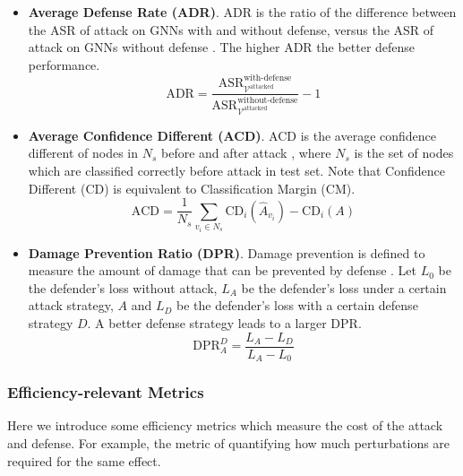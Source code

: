 \begin{itemize}
	\item \textbf{Average Defense Rate (ADR)}. ADR is the ratio of the difference between the ASR of attack on GNNs with and without defense, versus the ASR of attack on GNNs without defense \cite{chen2019can}. The higher ADR the better defense performance.
	      \begin{equation}
		      \text{ADR}=\frac{\text{ASR}^{\text{with-defense}}_{\mathcal{V}^{\text{attacked}}}}{\text{ASR}^{\text{without-defense}}_{\mathcal{V}^{\text{attacked}}}}-1
	      \end{equation}

	\item \textbf{Average Confidence Different (ACD)}. ACD is the average confidence different of nodes in $N_s$ before and after attack \cite{chen2019can}, where $N_s$ is the set of nodes which are classified correctly before attack in test set. Note that Confidence Different (CD) is equivalent to Classification Margin (CM).
	      \begin{equation}
		      \text{ACD}=\frac{1}{N_s}\sum_{v_{i}\in N_{s}} \text{CD}_{i}(\hat{A}_{v_{i}})-\text{CD}_{i}(A)
	      \end{equation}

	\item \textbf{Damage Prevention Ratio (DPR)}. Damage prevention is defined to measure the amount of damage that can be prevented by defense \cite{zhou2019adversarial}. Let $L_0$ be the defender's loss without attack, $L_A$ be the defender's loss under a certain attack strategy, $A$ and $L_D$ be the defender's loss with a certain defense strategy $D$. A better defense strategy leads to a larger DPR.
	      \begin{equation}
		      \text{DPR}_A^D=\frac{L_A-L_D}{L_A-L_0}
	      \end{equation}
\end{itemize}

\subsubsection{Efficiency-relevant Metrics}
Here we introduce some efficiency metrics which measure the cost of the attack and defense. For example, the metric of quantifying how much perturbations are required for the same effect.

